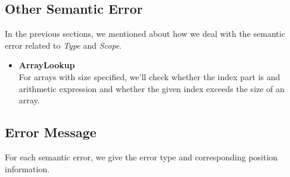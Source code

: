 \documentclass[a4paper,11pt]{article}
\begin{document}
\subsection{Other Semantic Error}
	In the previous sections, we mentioned about how we deal with the semantic error related to \emph{Type} and \emph{Scope}. 
	
	\begin{itemize}
	
	\item \textbf{ArrayLookup} \\
	For arrays with size specified, we'll check whether the index part is and arithmetic expression and whether the given index exceeds the size of an array. 
	
	\end{itemize}
	
\subsection{Error Message}
	For each semantic error, we give the error type and corresponding position information.
	
\end{document}
